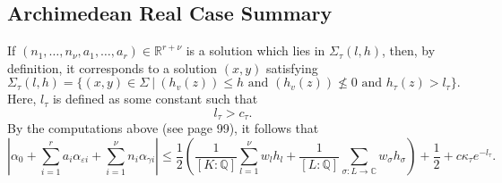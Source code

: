 %
%
%
%

\subsection{Archimedean Real Case Summary}
If $(n_1, \dots, n_{\nu}, a_1, \dots, a_r) \in \mathbb{R}^{r+\nu}$ is a solution which lies in $\Sigma_{\tau}(l,h)$, then, by definition, it corresponds to a solution $(x,y)$ satisfying
\[\Sigma_{\tau}(l,h) = \{(x,y) \in \Sigma \ | \ (h_v(z))\leq h \text{ and }  (h_v(z))\nleq 0 \text{ and } h_{\tau}(z)>l_{\tau}\}.\]
Here, $l_{\tau}$ is defined as some constant such that 
\[l_{\tau} > c_{\tau}.\]
By the computations above (see page 99), it follows that
\[\left|\alpha_0+\sum_{i = 1}^r a_i \alpha_{\varepsilon i} + \sum_{i = 1}^{\nu} n_i \alpha_{\gamma i}\right|
 \leq \frac{1}{2}\left(\frac{1}{[K:\mathbb{Q}]}\sum_{l = 1}^{\nu}w_l h_l + \frac{1}{[L:\mathbb{Q}]}\sum_{\sigma :L \to \mathbb{C}} w_{\sigma}h_{\sigma} \right) + \frac{1}{2} + c\kappa_{\tau}e^{-l_{\tau}}.\]

